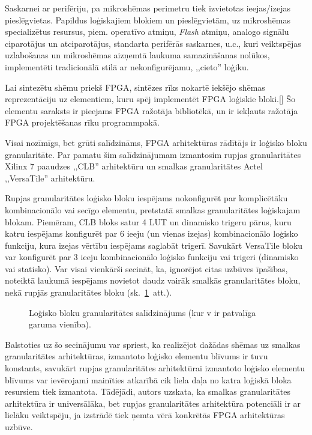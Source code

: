 	Saskarnei ar perifēriju, pa mikroshēmas perimetru tiek izvietotas
	ieejas/izejas pieslēgvietas. Papildus loģiskajiem blokiem un
	pieslēgvietām, uz mikroshēmas specializētus resursus, piem. operatīvo
	atmiņu, \textit{Flash} atmiņu, analogo signālu ciparotājus un 
	atciparotājus, standarta perifērās saskarnes, u.c.,%
	\cite{SmartFusionFabric}\cite{Xilinx7} kuri veiktspējas uzlabošanas 
	un mikroshēmas aizņemtā laukuma samazināšanas nolūkos, implementēti
	tradicionālā stilā ar nekonfigurējamu, ,,cieto'' loģiku.
	
	Lai sintezētu shēmu priekš FPGA, sintēzes rīks nokartē iekšējo shēmas
	reprezentāciju uz elementiem, kuru spēj implementēt FPGA loģiskie bloki.[\todo]
	Šo elementu saraksts ir pieejams FPGA ražotāja bibliotēkā, un ir
	iekļauts ražotāja FPGA projektēšanas rīku programmpakā.
	
	Visai nozīmīgs, bet grūti salīdzināms, FPGA arhitektūras rādītājs ir 
	loģisko bloku granularitāte. Par pamatu šim salīdzinājumam izmantosim
	rupjas granularitātes\linebreak
	Xilinx 7 paaudzes ,,CLB'' arhitektūru\cite{Xilinx7}
	un smalkas granularitātes Actel ,,VersaTile''
	arhitektūru\cite{SmartFusionFabric}.
	
	Rupjas granularitātes loģisko bloku iespējams nokonfigurēt par
	komplicētāku kombinacionālo vai secīgo elementu, pretstatā smalkas
	granularitātes loģiskajam blokam. Piemēram, CLB bloks satur 4 LUT un
	dinamisko trigeru pārus, kuru katru iespējams
	konfigurēt par 6 ieeju (un vienas izejas) kombinacionālo loģisko
	funkciju, kura izejas vērtību iespējams saglabāt trigerī.%
	\cite[6.~lpp.]{Xilinx7}
	Savukārt VersaTile bloku var konfigurēt par 3 ieeju kombinacionālo
	loģisko funkciju vai trigeri (dinamisko vai statisko).%
	\cite[3.~lpp.]{SmartFusionFabric}
	Var visai vienkārši secināt, ka, ignorējot citas uzbūves īpašības, 
	noteiktā laukumā iespējams novietot daudz vairāk smalkās granularitātes
	bloku, nekā rupjās granularitātes bloku (sk.~\ref{fig:tiles}~att.).
	\begin{figure}[hb]
		\centering
		
		\caption[Loģisko bloku granularitātes salīdzinājums.]%
			{Loģisko bloku granularitātes salīdzinājums 
				(kur v ir patvaļīga garuma vienība).}
		\label{fig:tiles}
	\end{figure}
	
	Balstoties uz šo secinājumu var spriest, ka realizējot dažādas shēmas
	uz smalkas granularitātes arhitektūras,
	izmantoto loģisko elementu blīvums ir tuvu konstants, savukārt rupjas
	granularitātes arhitektūrai izmantoto loģisko elementu blīvums var
	ievērojami mainīties atkarībā cik liela daļa no katra loģiskā bloka
	resursiem tiek izmantota. Tādējādi, autors uzskata, ka smalkas
	granularitātes arhitektūra ir universālāka, bet rupjas granularitātes 
	arhitektūra potenciāli ir ar lielāku veiktspēju, ja izstrādē tiek ņemta
	vērā konkrētās FPGA arhitektūras uzbūve.
	
